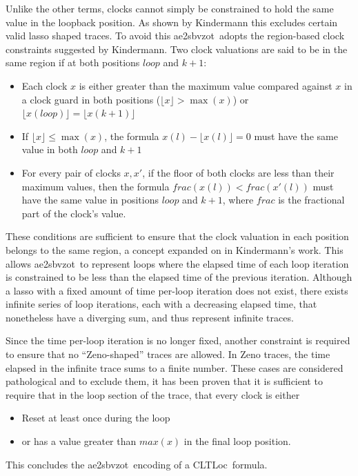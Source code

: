 \documentclass[a4paper,11pt]{report}
\theoremstyle{definition}
\newcommand{\cltloc}{CLTLoc}
\newcommand{\aez}{ae2sbvzot}
\begin{document}
Unlike the other terms, clocks cannot simply be constrained to hold the same
value in the loopback position. As shown by Kindermann\cite{kindermann12} this
excludes certain valid lasso shaped traces. To avoid this \aez\ adopts the
region-based clock constraints suggested by Kindermann. Two clock valuations are
said to be in the same region if at both positions $loop$ and $k{+}1$:
\begin{itemize}
  \item Each clock $x$ is either greater than the maximum value compared against
    $x$ in a clock guard in both positions ($\lfloor x \rfloor > \max(x)$) or
    $\lfloor x(loop) \rfloor = \lfloor x(k{+}1) \rfloor$
  \item If $\lfloor x \rfloor \leq \max(x)$, the formula
    $x(l) - \lfloor x(l) \rfloor = 0$ must have the same value in both $loop$
    and $k{+}1$
  \item For every pair of clocks $x,x'$, if the floor of both clocks are less
    than their maximum values, then the formula
    $frac(x(l)) < frac(x'(l))$ must have the same value in positions $loop$ and
    $k{+}1$, where $frac$ is the fractional part of the clock's value.
\end{itemize}
These conditions are sufficient to ensure that the clock valuation in each
position belongs to the same region, a concept expanded on in Kindermann's
work\cite{kindermann12}. This allows \aez\ to represent loops where the elapsed
time of each loop iteration is constrained to be less than the elapsed time of
the previous iteration. Although a lasso with a fixed amount of time per-loop
iteration does not exist, there exists infinite series of loop iterations, each
with a decreasing elapsed time, that nonetheless have a diverging sum, and thus
represent infinite traces.

Since the time per-loop iteration is no longer fixed, another constraint is
required to ensure that no ``Zeno-shaped'' traces are allowed. In Zeno traces,
the time elapsed in the infinite trace sums to a finite number. These cases are
considered pathological and to exclude them, it has been
proven\cite{kindermann12} that it is sufficient to require that in the loop
section of the trace, that every clock is either
\begin{itemize}
  \item Reset at least once during the loop
  \item or has a value greater than $max(x)$ in the final loop position.
\end{itemize}
This concludes the \aez\ encoding of a \cltloc\ formula.
\end{document}
